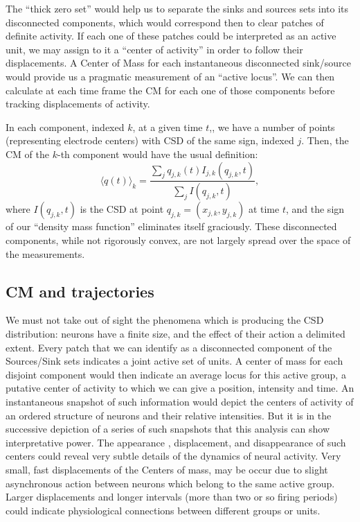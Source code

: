 \documentclass[12pt]{article}
\begin{document}
The ``thick zero set'' would help us to separate the sinks and sources sets into
its disconnected components, which would correspond then to clear patches of
definite activity. If each one of these patches could be
interpreted as an active unit,
we may assign to it a ``center of activity'' in order to follow their displacements.
A Center of Mass for each instantaneous disconnected sink/source would provide us
a pragmatic measurement of an ``active locus''. We can then calculate at each time
frame the CM for each one of those components before tracking displacements of activity.


In each component, indexed $k$, at a given time $t$,, we have a number of points
(representing electrode centers)
with CSD of the same sign, indexed $j$. Then, the CM of the $k$-th
component would have the usual definition:
\begin{equation}\label{cmparadisj}
   \langle q(t) \rangle_k =\frac{\sum_j q_{j,k} (t) I_{j,k} (q_{j,k},t)}
           {\sum_j I(q_{j,k},t)},
\end{equation}
where $I(q_{j,k},t)$ is the CSD at point $q_{j,k}=(x_{j,k}, y_{j,k})$ at time $t$,
and the
sign of our ``density mass function'' eliminates itself graciously.
These disconnected components, while not rigorously convex,
are not largely spread over the space of the measurements.



\subsection{CM and trajectories}

We must not take out of sight the phenomena which is producing the CSD distribution:
neurons have a finite size, and the effect of their action a delimited extent.
Every patch that we can identify as a disconnected component of the Sources/Sink
sets indicates a  joint active set of units. A center of mass for each disjoint
component would then indicate an average locus for this active group, a putative center of activity to which we can give a position, intensity and time. An instantaneous snapshot of such information would depict the centers of activity of an ordered structure of neurons and their relative intensities. But it is in the successive depiction of a series of such snapshots that this analysis can show interpretative power. The appearance , displacement, and disappearance of such centers could reveal very subtle details of the dynamics of neural activity. Very small, fast displacements of the Centers of mass, may be occur due to slight asynchronous action between neurons which belong to the same active group.
Larger displacements and  longer intervals (more than two or so firing periods)
could indicate physiological connections between different groups or units.
\end{document}
